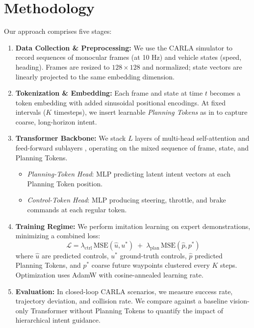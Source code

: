 \documentclass[11pt,a4paper]{article}
\begin{document}
\section*{Methodology}

Our approach comprises five stages:

\begin{enumerate}
    \item \textbf{Data Collection \& Preprocessing:}
          We use the CARLA simulator \cite{Dosovitskiy2017CARLA} to record sequences of monocular frames (at 10 Hz) and vehicle states (speed, heading). Frames are resized to \(128\times128\) and normalized; state vectors are linearly projected to the same embedding dimension.

    \item \textbf{Tokenization \& Embedding:}
          Each frame and state at time \(t\) becomes a token embedding with added sinusoidal positional encodings. At fixed intervals (\(K\) timesteps), we insert learnable \emph{Planning Tokens} as in \cite{Clinton2024planning} to capture coarse, long-horizon intent.

    \item \textbf{Transformer Backbone:}
          We stack \(L\) layers of multi-head self-attention and feed-forward sublayers \cite{Vaswani2017attention}, operating on the mixed sequence of frame, state, and Planning Tokens.
          \begin{itemize}
              \item \emph{Planning-Token Head}: MLP predicting latent intent vectors at each Planning Token position.
              \item \emph{Control-Token Head}: MLP producing steering, throttle, and brake commands at each regular token.
          \end{itemize}

    \item \textbf{Training Regime:}
          We perform imitation learning on expert demonstrations, minimizing a combined loss:
          \[
              \mathcal{L} = \lambda_{\text{ctrl}}\,\mathrm{MSE}(\hat{u},u^*) \;+\;
              \lambda_{\text{plan}}\,\mathrm{MSE}(\hat{p},p^*)
          \]
          where \(\hat{u}\) are predicted controls, \(u^*\) ground-truth controls, \(\hat{p}\) predicted Planning Tokens, and \(p^*\) coarse future waypoints clustered every \(K\) steps. Optimization uses AdamW with cosine-annealed learning rate.

    \item \textbf{Evaluation:}
          In closed-loop CARLA scenarios, we measure success rate, trajectory deviation, and collision rate. We compare against a baseline vision-only Transformer without Planning Tokens to quantify the impact of hierarchical intent guidance.
\end{enumerate}
\end{document}
